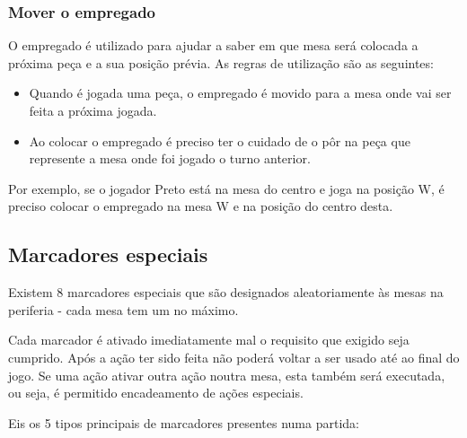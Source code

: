 \documentclass[a4paper]{article}
\begin{document}
\newpage
\subsubsection{Mover o empregado}
O empregado é utilizado para ajudar a saber em que mesa será colocada a próxima peça e a sua posição prévia. As regras de utilização são as seguintes:
\begin{itemize}
\item Quando é jogada uma peça, o empregado é movido para a mesa onde vai ser feita a próxima jogada.
\item Ao colocar o empregado é preciso ter o cuidado de o pôr na peça que represente a mesa onde foi jogado o turno anterior.
\end{itemize}

Por exemplo, se o jogador Preto está na mesa do centro e joga na posição W, é preciso colocar o empregado na mesa W e na posição do centro desta.

\subsection{Marcadores especiais}

Existem 8 marcadores especiais que são designados aleatoriamente às mesas na periferia - cada mesa tem um no máximo. 

Cada marcador é ativado imediatamente mal o requisito que exigido seja cumprido. Após a ação ter sido feita não poderá voltar a ser usado até ao final do jogo. Se uma ação ativar outra ação noutra mesa, esta também será executada, ou seja, é permitido encadeamento de ações especiais. \newline

Eis os 5 tipos principais de marcadores presentes numa partida: \newline
\end{document}
